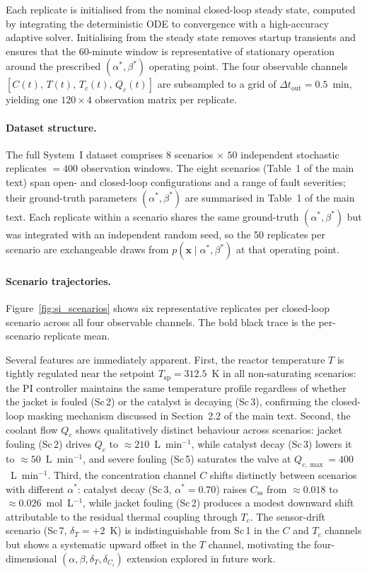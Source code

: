\documentclass[aps,pre,twocolumn,superscriptaddress]{revtex4-2}
\begin{document}
Each replicate is initialised from the nominal closed-loop steady state, computed
by integrating the deterministic ODE to convergence with a high-accuracy adaptive
solver.  Initialising from the steady state removes startup transients and ensures
that the 60-minute window is representative of stationary operation around the
prescribed $(\alpha^*,\beta^*)$ operating point.  The four observable channels
$[C(t),\,T(t),\,T_c(t),\,Q_c(t)]$ are subsampled to a grid of $\Delta t_\mathrm{out}
= 0.5$~min, yielding one $120\times4$ observation matrix per replicate.

\paragraph{Dataset structure.}
The full System~I dataset comprises $8$ scenarios $\times$ $50$ independent
stochastic replicates $= 400$ observation windows.  The eight scenarios
(Table~1 of the main text) span open- and closed-loop configurations and a
range of fault severities; their ground-truth parameters $(\alpha^*,\beta^*)$
are summarised in Table~1 of the main text.  Each replicate
within a scenario shares the same ground-truth $(\alpha^*,\beta^*)$ but was
integrated with an independent random seed, so the 50 replicates per scenario
are exchangeable draws from $p(\mathbf{x}\mid\alpha^*,\beta^*)$ at that
operating point.

\paragraph{Scenario trajectories.}
Figure~\ref{fig:si_scenarios} shows six representative replicates per closed-loop
scenario across all four observable channels.  The bold black trace is the
per-scenario replicate mean.

Several features are immediately apparent.  First, the reactor temperature $T$
is tightly regulated near the setpoint $T_\mathrm{sp} = 312.5$~K in all
non-saturating scenarios: the PI controller maintains the same temperature
profile regardless of whether the jacket is fouled (Sc\,2) or the catalyst
is decaying (Sc\,3), confirming the closed-loop masking mechanism discussed in
Section~2.2 of the main text.  Second, the coolant flow $Q_c$ shows
qualitatively distinct behaviour across scenarios: jacket fouling (Sc\,2) drives
$Q_c$ to $\approx 210$~L~min$^{-1}$, while catalyst decay (Sc\,3) lowers it
to $\approx 50$~L~min$^{-1}$, and severe fouling (Sc\,5) saturates the valve
at $Q_{c,\max} = 400$~L~min$^{-1}$.  Third, the concentration channel $C$
shifts distinctly between scenarios with different $\alpha^*$: catalyst decay
(Sc\,3, $\alpha^*=0.70$) raises $C_\mathrm{ss}$ from $\approx 0.018$ to
$\approx 0.026$~mol~L$^{-1}$, while jacket fouling (Sc\,2) produces a modest
downward shift attributable to the residual thermal coupling through $T_c$.
The sensor-drift scenario (Sc\,7, $\delta_T = +2$~K) is indistinguishable from
Sc\,1 in the $C$ and $T_c$ channels but shows a systematic upward offset in
the $T$ channel, motivating the four-dimensional
$(\alpha,\beta,\delta_T,\delta_{C_i})$ extension explored in future work.
\end{document}
